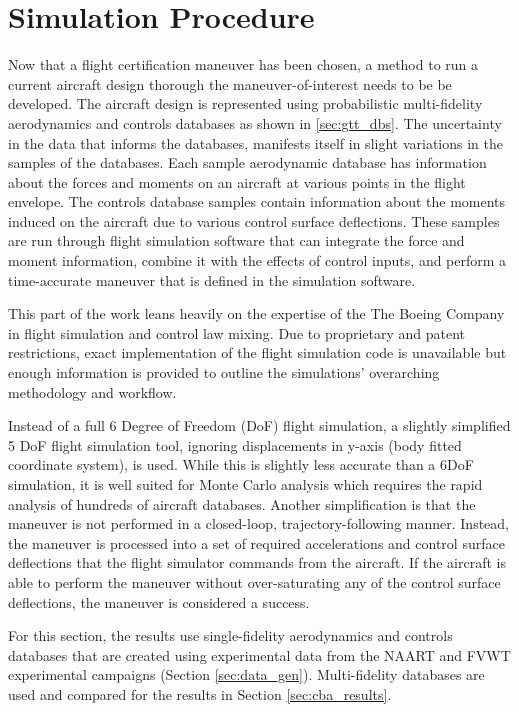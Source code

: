 \section{Simulation Procedure} \label{sec:sim_procedure}

Now that a flight certification maneuver has been chosen, a method to run a current aircraft design thorough the maneuver-of-interest needs to be be developed.
The aircraft design is represented using probabilistic multi-fidelity aerodynamics and controls databases as shown in \ref{sec:gtt_dbs}.
The uncertainty in the data that informs the databases, manifests itself in slight variations in the samples of the databases.
Each sample aerodynamic database has information about the forces and moments on an aircraft at various points in the flight envelope.
The controls database samples contain information about the moments induced on the aircraft due to various control surface deflections. 
These samples are run through flight simulation software that can integrate the force and moment information, combine it with the effects of control inputs, and perform a time-accurate maneuver that is defined in the simulation software. 

This part of the work leans heavily on the expertise of the The Boeing Company in flight simulation and control law mixing.
Due to proprietary and patent restrictions, exact implementation of the flight simulation code is unavailable but enough information is provided to outline the simulations' overarching methodology and workflow.

Instead of a full 6 Degree of Freedom (DoF) flight simulation, a slightly simplified 5 DoF flight simulation tool, ignoring displacements in y-axis (body fitted coordinate system), is used.
While this is slightly less accurate than a 6DoF simulation, it is well suited for Monte Carlo analysis which requires the rapid analysis of hundreds of aircraft databases.
Another simplification is that the maneuver is not performed in a closed-loop, trajectory-following manner. 
Instead, the maneuver is processed into a set of required accelerations and control surface deflections that the flight simulator commands from the aircraft. 
If the aircraft is able to perform the maneuver without over-saturating any of the control surface deflections, the maneuver is considered a success.

For this section, the results use single-fidelity aerodynamics and controls databases that are created using experimental data from the NAART and FVWT experimental campaigns (Section \ref{sec:data_gen}). 
Multi-fidelity databases are used and compared for the results in Section \ref{sec:cba_results}.

